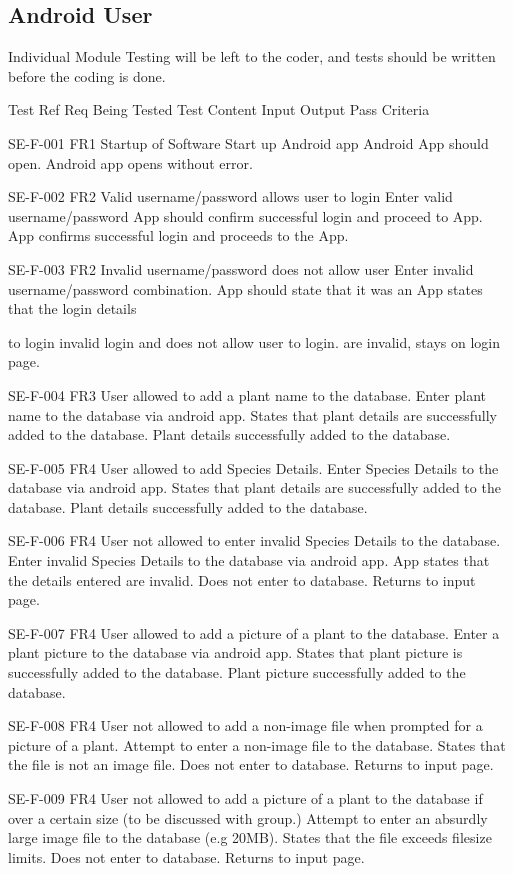 \subsection{Android User}
Individual Module Testing will be left to the coder, and tests should be written before the coding is done.

Test Ref Req Being Tested Test Content Input Output Pass Criteria

SE-F-001 FR1 Startup of Software Start up Android app Android App should open. Android app opens without error.

SE-F-002 FR2 Valid username/password allows user to login Enter valid username/password App should confirm successful login and proceed to App. App confirms successful login and proceeds to the App.

SE-F-003 FR2 Invalid username/password does not allow user Enter invalid username/password combination. App should state that it was an App states that the login details

to login invalid login and does not allow user to login. are invalid, stays on login page.

SE-F-004 FR3 User allowed to add a plant name to the database. Enter plant name to the database via android app. States that plant details are successfully added to the database. Plant details successfully added to the database.

SE-F-005 FR4 User allowed to add Species Details. Enter Species Details to the database via android app. States that plant details are successfully added to the database. Plant details successfully added to the database.

SE-F-006 FR4 User not allowed to enter invalid Species Details to the database. Enter invalid Species Details to the database via android app. App states that the details entered are invalid. Does not enter to database. Returns to input page.

SE-F-007 FR4 User allowed to add a picture of a plant to the database. Enter a plant picture to the database via android app. States that plant picture is successfully added to the database. Plant picture successfully added to the database.

SE-F-008 FR4 User not allowed to add a non-image file when prompted for a picture of a plant. Attempt to enter a non-image file to the database. States that the file is not an image file. Does not enter to database. Returns to input page.

SE-F-009 FR4 User not allowed to add a picture of a plant to the database if over a certain size (to be discussed with group.) Attempt to enter an absurdly large image file to the database (e.g 20MB). States that the file exceeds filesize limits. Does not enter to database. Returns to input page.

